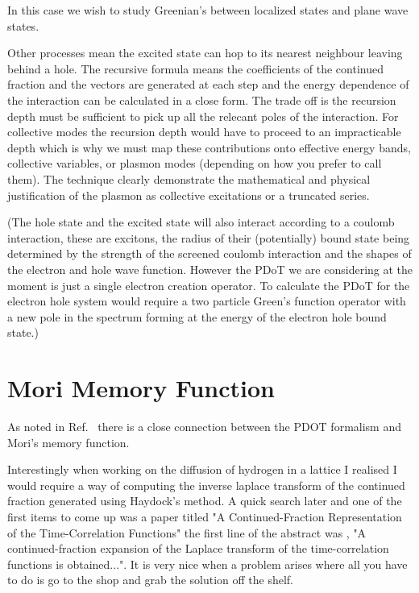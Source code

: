 \documentclass{article}
\begin{document}
In this case we wish to study Greenian's between localized states and plane wave states.

Other processes mean the excited state can hop 
to its nearest neighbour leaving behind a hole. The recursive formula means
the coefficients of the continued fraction and the vectors are generated at
each step and the energy dependence of the interaction can be calculated 
in a close form. The trade off is the recursion depth must be sufficient to
pick up all the relecant poles of the interaction. For collective modes
the recursion depth would have to proceed to an impracticable depth which
is why we must map these contributions onto effective energy bands, collective
variables, or plasmon modes (depending on how you prefer to call them). The technique
clearly demonstrate the mathematical and physical justification of the plasmon as
collective excitations or a truncated series.

(The hole state and the excited state will also interact according to a coulomb interaction,
these are excitons, the radius of their (potentially) bound state being determined 
by the strength of the screened coulomb interaction and the shapes of the electron and hole
wave function. However the PDoT we are considering at the moment is just a 
single electron creation operator.
To calculate the PDoT for the electron hole system would require a 
two particle Green's function operator with a new pole in the spectrum forming
at the energy of the electron hole bound state.)

\section{Mori Memory Function}
\label{sec:morimemory}
  As noted in Ref.~\cite{annett94} there is a close connection between the PDOT
formalism and Mori's memory function. 

Interestingly when working on the diffusion
of hydrogen in a lattice I realised I would require a way of computing the
inverse laplace transform of the continued fraction generated 
using Haydock's method. A quick search later and one of the first items to come up
was a paper titled "A Continued-Fraction Representation of the Time-Correlation
Functions" the first line of the abstract was , "A continued-fraction expansion of the Laplace
transform of the time-correlation functions is obtained...". It is very nice when a problem
arises where all you have to do is go to the shop and grab the solution off the shelf.
\end{document}
